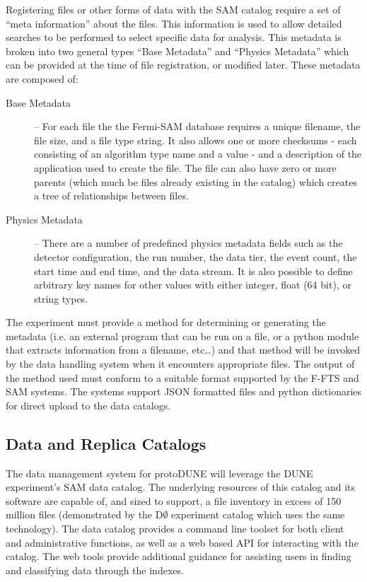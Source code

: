 \documentclass[12pt]{article}
\newcommand{\pd}{protoDUNE\xspace}
\begin{document}
{Registering files or other forms of data with the SAM catalog require a set of ``meta information'' about the files.  This information is used to allow detailed searches to be performed to select specific data for analysis.  This metadata is broken into two general types ``Base Metadata'' and ``Physics Metadata'' which can be provided at the time of file registration, or modified later.  These metadata are composed of:
\begin{description}
\item[Base Metadata] -- For each file the the Fermi-SAM database requires a unique filename, the file size, and a file type string. It also allows one or more checksums - each consisting of an algorithm type name and a value - and a description of the application used to create the file. The file can also have zero or more parents (which much be files already existing in the catalog) which creates a tree of relationships between files.
\item[Physics Metadata] -- There are a number of predefined physics metadata fields such as the detector configuration, the run number, the data tier, the event count, the start time and end time, and the data stream. It is also possible to define arbitrary key names for other values with either integer, float (64 bit), or string types.
\end{description}

\noindent
The experiment must provide a method for determining or generating the metadata (i.e. an external program that can be run on a file, or a python module that extracts information from a filename, etc…)  and that method will be invoked by the data handling system when it encounters appropriate files.  The output of the method used must conform to a suitable format supported by the F-FTS and SAM systems.  The systems support JSON formatted files and python dictionaries for direct upload to the data catalogs.  

\subsection{Data and Replica Catalogs}

The data management system for \pd will leverage the DUNE experiment’s SAM data catalog.
 The underlying resources of this catalog and its software are capable of, and sized to support,
a file inventory in excess of 150 million files (demonstrated by the D$\emptyset$ experiment catalog which
uses the same technology).  The data catalog provides a command line toolset for both client and
administrative functions, as well as a web based API for interacting with the catalog.  The web tools
provide additional guidance for assisting users in finding and classifying data through the indexes.

}
\end{document}
